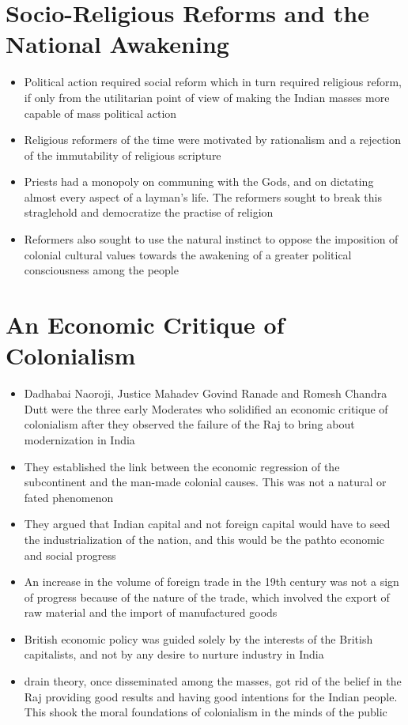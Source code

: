 \section{Socio-Religious Reforms and the National Awakening}
\begin{itemize}
    \item Political action required social reform which in turn required religious reform, if only from the utilitarian point of view of making the Indian masses more capable of mass political action
    \item Religious reformers of the time were motivated by rationalism and a rejection of the immutability of religious scripture
    \item Priests had a monopoly on communing with the Gods, and on dictating almost every aspect of a layman's life. The reformers sought to break this straglehold and democratize the practise of religion
    \item Reformers also sought to use the natural instinct to oppose the imposition of colonial cultural values towards the awakening of a greater political consciousness among the people
\end{itemize}

\section{An Economic Critique of Colonialism}
\begin{itemize}
    \item Dadhabai Naoroji, Justice Mahadev Govind Ranade and Romesh Chandra Dutt were the three early Moderates who solidified an economic critique of colonialism after they observed the failure of the Raj to bring about modernization in India
    \item They established the link between the economic regression of the subcontinent and the man-made colonial causes. This was not a natural or fated phenomenon
    \item They argued that Indian capital and not foreign capital would have to seed the industrialization of the nation, and this would be the pathto economic and social progress
    \item An increase in the volume of foreign trade in the 19th century was not a sign of progress because of the nature of the trade, which involved the export of raw material and the import of manufactured goods
    \item British economic policy was guided solely by the interests of the British capitalists, and not by any desire to nurture industry in India
    \item \Gls{drain theory}, once disseminated among the masses, got rid of the belief in the Raj providing good results and having good intentions for the Indian people. This shook the moral foundations of colonialism in the minds of the public
\end{itemize}

